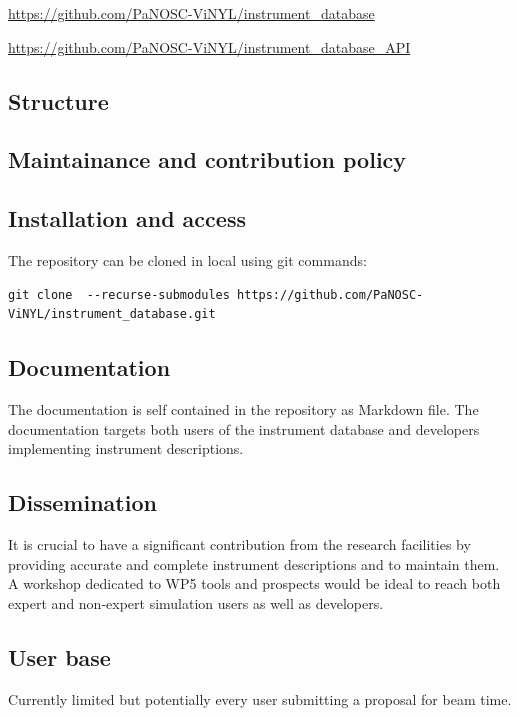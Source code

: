 \documentclass[11pt, a4paper]{article}
\begin{document}
\href{https://github.com/PaNOSC-ViNYL/instrument_database}{https://github.com/PaNOSC-ViNYL/instrument\_database}


\href{https://github.com/PaNOSC-ViNYL/instrument_database_API}{https://github.com/PaNOSC-ViNYL/instrument\_database\_API}

\subsection{Structure}
\subsection{Maintainance and contribution policy}

\subsection{Installation and access}
The repository can be cloned in local using git commands:
\begin{verbatim}
git clone  --recurse-submodules https://github.com/PaNOSC-ViNYL/instrument_database.git
\end{verbatim}


\subsection{Documentation}
The documentation is self contained in the repository as Markdown file. 
The documentation targets both users of the instrument database and developers implementing instrument descriptions.

\subsection{Dissemination}
It is crucial to have a significant contribution from the research facilities by providing accurate and complete instrument descriptions and to maintain them.
A workshop dedicated to WP5 tools and prospects would be ideal to reach both expert and non-expert simulation users as well as developers.

\subsection{User base}
Currently limited but potentially every user submitting a proposal for beam time.
\end{document}

